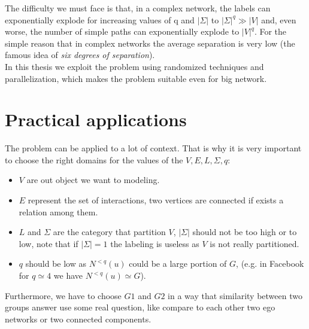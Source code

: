 The difficulty we must face is that, in a complex network, the labels can exponentially explode for increasing values of q and $|\Sigma|$ to $|\Sigma|^{q} \gg |V|$ and, even worse, the number of simple paths can exponentially explode to $|V|^{q}$. 
For the simple reason that in complex networks the average separation is very low (the famous idea of \textit{six degrees of separation}).\\

In this thesis we exploit the problem using randomized techniques and parallelization, which makes the problem suitable even for big network. 

\section{Practical applications}

The problem can be applied to a lot of context.
That is why it is very important to choose the right domains for the values of the $V, E, L, \Sigma, q$:
\begin{itemize}
\item $V$ are out object we want to modeling.
\item $E$ represent the set of interactions, two vertices are connected if exists a relation among them.
\item $L$ and $\Sigma$ are the category that partition $V$, $|\Sigma|$ should not be too high or to low, note that if $|\Sigma| = 1$ the labeling is useless as $V$ is not really partitioned.
\item $q$ should be low as $N^{<q}(u)$ could be a large portion of $G$, (e.g. in Facebook for $q \simeq 4$ we have $N^{<q}(u) \simeq G$)\cite{Facebook}.
\end{itemize}

Furthermore, we have to choose $G1$ and $G2$ in a way that similarity between two groups answer use some real question, like compare to each other two ego networks or two connected components.\\

